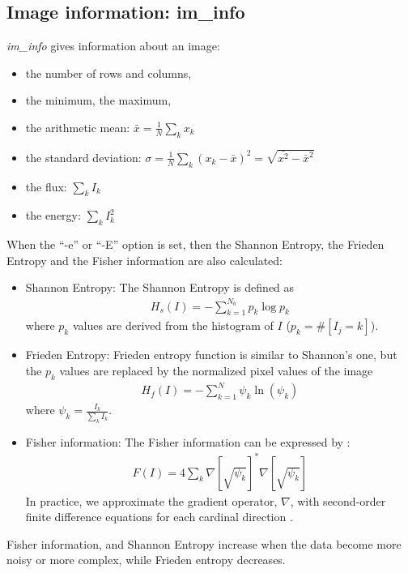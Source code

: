 \subsection{Image information: im\_info}

{\em im\_info} gives information about an image:
\begin{itemize}
\baselineskip=0.4truecm
\item the number of rows and columns,
\item the minimum, the maximum,  
\item the arithmetic mean: $  {\bar x} = \frac{1}{N}\sum_k x_k$
\item the standard deviation: $\sigma = \frac{1}{N} \sum_k (x_k - {\bar x})^2 = \sqrt{{\bar {x^2}} - {\bar x}^2}$
\item the flux: $\sum_k I_k$
\item the energy: $\sum_k I_k^2$

\end{itemize}
When the ``-e'' or ``-E'' 
option is set, then the  Shannon Entropy, the Frieden Entropy and 
the Fisher information are also calculated:
\begin{itemize}
\baselineskip=0.4truecm
\item{Shannon Entropy:} The Shannon Entropy \cite{ima:shannon48} is defined as
\begin{eqnarray}
H_s(I) = - \sum_{k=1}^{N_b} p_k \log p_k
\end{eqnarray}
where $p_k$ values are derived from the histogram 
of $I$ ($p_k = {\mbox{\#}[ I_j = k]}$).  
\item{Frieden Entropy:} 
Frieden \cite{entropy:frieden75} 
entropy function is similar to Shannon's one, but the $p_k$ values 
are replaced by the normalized pixel values of the image
\begin{eqnarray}
H_f(I) = -\sum_{k=1}^N \psi_k \ln(\psi_k)
\end{eqnarray}
where $\psi_k = \frac{I_k}{\sum_k I_k}$. 
\item{Fisher information:} 
The Fisher information can be expressed by \cite{ima:frieden98,ima:hunt99}:
\begin{eqnarray}
F(I) = 4 \sum_k \nabla \left[ \sqrt{\psi_k} \right]^* 
                \nabla \left[ \sqrt{\psi_k} \right]		
\end{eqnarray}
In practice, we approximate the gradient operator, $\nabla$, with second-order
finite difference equations for each cardinal direction \cite{ima:hunt99}.
\end{itemize}
Fisher information, and Shannon Entropy in\-crea\-se when the data be\-come
more noisy or more complex, while Frieden entropy decreases. \\

